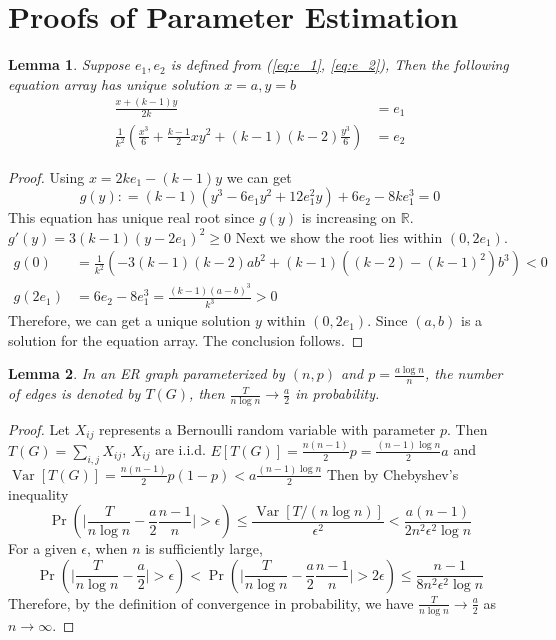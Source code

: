 \documentclass{article}
\newtheorem{lemma}{Lemma}
\DeclareMathOperator{\Var}{Var}
\begin{document}
\section{Proofs of Parameter Estimation}
	\begin{lemma}
		Suppose $e_1, e_2$ is defined from (\ref{eq:e_1}, \ref{eq:e_2}), Then the following equation array has unique solution $x=a, y=b$
		\begin{align}
	\frac{x+(k-1)y}{2k} & = e_1 \\
\frac{1}{k^2}
\left(\frac{x^3}{6} + \frac{k-1}{2}xy^2 + (k-1)(k-2)\frac{y^3}{6}\right) & = e_2	
		\end{align}
	\end{lemma}
\begin{proof}
	Using $x=2ke_1 - (k-1)y$ we can get
	\begin{equation}
	g(y): = (k-1)(y^3 - 6 e_1 y^2 + 12 e_1^2 y) + 6 e_2 - 8 k e_1^3 = 0
	\end{equation}
	This equation has unique real root since $g(y)$ is increasing on $\mathbb{R}$. $g'(y) = 3(k-1)(y-2e_1)^2 \geq 0 $
	Next we show the root lies within $(0, 2e_1)$.
	\begin{align*}
	g(0) &= \frac{1}{k^2}\left(-3(k-1)(k-2)ab^2 + (k-1)((k-2)-(k-1)^2)b^3\right) < 0 \\
	g(2e_1) &= 6e_2 - 8e_1^3 = \frac{(k-1)(a-b)^3}{k^3} > 0
	\end{align*}
	Therefore, we can get a unique solution $y$ within $(0, 2e_1)$. Since $(a,b)$ is a solution for the equation array. The conclusion follows.
	
\end{proof}
	\begin{lemma}\label{lem:ERT}
	In an ER graph parameterized by $(n,p)$ and $p=\frac{a\log n}{n}$, the number of edges is denoted by $T(G)$, then
	$\frac{T}{n \log n} \to \frac{a}{2}$ in probability.
	\end{lemma}
\begin{proof}
	Let $X_{ij}$ represents a Bernoulli random variable with parameter $p$. Then $T(G) = \sum_{i,j} X_{ij}$, $X_{ij}$ are i.i.d.
	$E[T(G)] = \frac{n(n-1)}{2}p = \frac{(n-1)\log n}{2}a$ and $\Var[T(G)] = \frac{n(n-1)}{2} p(1-p) < a\frac{(n-1)\log n}{2}$
	Then by Chebyshev's inequality
	$$
	\Pr(\Big|\frac{T}{n \log n } - \frac{a}{2} \frac{n-1}{n}\Big| > \epsilon) \leq \frac{\Var[T /(n \log n )]}{\epsilon^2} < \frac{a(n-1)}{2n^2\epsilon^2\log n}
	$$
	For a given $\epsilon$, when $n$ is sufficiently large,
	$$
	\Pr(\Big|\frac{T}{n \log n } - \frac{a}{2} \Big| > \epsilon) < \Pr(\Big|\frac{T}{n \log n } - \frac{a}{2} \frac{n-1}{n}\Big| > 2\epsilon)
	\leq \frac{n-1}{8n^2 \epsilon^2 \log n}
	$$
	Therefore, by the definition of convergence in probability, we have $\frac{T}{n \log n} \to \frac{a}{2}$ as $n\to \infty$.
\end{proof}
\end{document}
